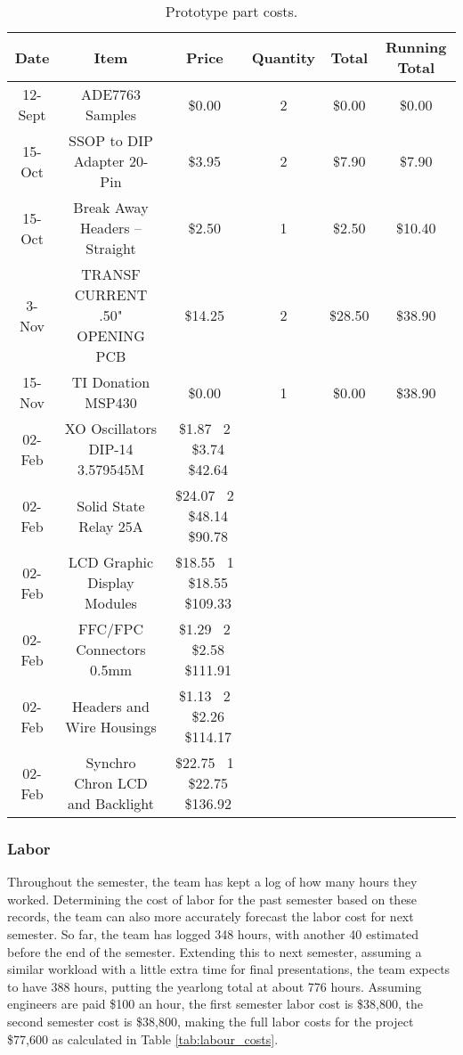 \begin{table}[htdp]
\caption{Prototype part costs.}
\begin{center}
\begin{tabular}{|c|c|c|c|c|c|}\hline\rowcolor{lightgray}
Date & Item & Price & Quantity & Total & Running Total\\\hline
12-Sept & ADE7763 Samples & \$0.00 & 2 & \$0.00 & \$0.00\\\hline
15-Oct & SSOP to DIP Adapter 20-Pin & \$3.95 & 2 & \$7.90 & \$7.90\\\hline
15-Oct & Break Away Headers -- Straight	& \$2.50 & 1 & \$2.50 & \$10.40\\\hline
3-Nov  & TRANSF CURRENT .50" OPENING PCB & \$14.25 & 2 & \$28.50 & \$38.90\\\hline
15-Nov & TI Donation MSP430 & \$0.00 & 1 & \$0.00 & \$38.90\\\hline
02-Feb & XO Oscillators DIP-14 3.579545M & \$1.87 \ 2 \ \$3.74 \ \$42.64 \\\hline
02-Feb & Solid State Relay 25A & \$24.07 \ 2 \ \$48.14 \ \$90.78 \\\hline
02-Feb & LCD Graphic Display Modules & \$18.55 \ 1 \ \$18.55 \ \$109.33 \\\hline
02-Feb & FFC/FPC Connectors 0.5mm & \$1.29 \ 2 \ \$2.58 \ \$111.91 \\\hline
02-Feb & Headers and Wire Housings & \$1.13 \ 2 \ \$2.26 \ \$114.17 \\\hline
02-Feb & Synchro Chron LCD and Backlight & \$22.75 \ 1 \ \$22.75 \ \$136.92 \\\hline
\end{tabular}
\end{center}
\label{tab:proto_part_cost}
\end{table}%

\subsubsection{Labor}
Throughout the semester, the team has kept a log of how many hours they worked. Determining the cost of labor for the past semester based on these records, the team can also more accurately forecast the labor cost for next semester. So far, the team has logged 348 hours, with another 40 estimated before the end of the semester. Extending this to next semester, assuming a similar workload with a little extra time for final presentations, the team expects to have 388 hours, putting the yearlong total at about 776 hours. Assuming engineers are paid \$100 an hour, the first semester labor cost is \$38,800, the second semester cost is \$38,800, making the full labor costs for the project \$77,600 as calculated in Table \ref{tab:labour_costs}. 

